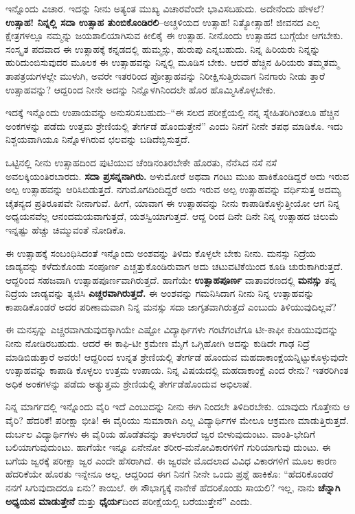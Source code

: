 ಇನ್ನೊಂದು ವಿಚಾರ. ಇದನ್ನು ನೀನು ಅತ್ಯಂತ ಮುಖ್ಯ ವಿಚಾರವೆಂದೇ ಭಾವಿಸಬಹುದು. ಅದೇನೆಂದು ಹೇಳಲೆ? \textbf{ಉತ್ಸಾಹ! ನಿನ್ನಲ್ಲಿ ಸದಾ ಉತ್ಸಾಹ ತುಂಬಿಕೊಂಡಿರಲಿ}–ಅಚ್ಚಳಿಯದ ಉತ್ಸಾಹ! ನಿತ್ಯೋತ್ಸಾಹ! ಜೀವನದ ಎಲ್ಲ ಕ್ಷೇತ್ರಗಳಲ್ಲೂ ನಮ್ಮನ್ನು ಜಯಶಾಲಿಯಾಗಿಸುವ ಕೀಲಿಕೈ ಈ ಉತ್ಸಾಹ. ನೀನೊಂದು ಉತ್ಸಾಹದ ಬುಗ್ಗೆಯೇ ಆಗಬೇಕು. ಸಂಸ್ಕೃತ ಪದವಾದ ಈ ಉತ್ಸಾಹಕ್ಕೆ ಕನ್ನಡದಲ್ಲಿ ಹುಮ್ಮಸ್ಸು, ಹುರುಪು ಎನ್ನಬಹುದು. ನಿನ್ನ ಹಿರಿಯರು ನಿನ್ನನ್ನು ಹುರಿದುಂಬಿಸುವುದರ ಮೂಲಕ ಈ ಉತ್ಸಾಹವನ್ನು ನಿನ್ನಲ್ಲಿ ಮೂಡಿಸ ಬೇಕು. ಆದರೆ ಹೆಚ್ಚಿನ ಹಿರಿಯರು ತಮ್ಮತಮ್ಮ ತಾಪತ್ರಯಗಳಲ್ಲೇ ಮುಳುಗಿ, ಅವರೇ ಇತರರಿಂದ ಪ್ರೋತ್ಸಾಹವನ್ನು ನಿರೀಕ್ಷಿಸುತ್ತಿರುವಾಗ ನಿನಗಾರು ನೀಡು ತ್ತಾರೆ ಉತ್ಸಾಹವನ್ನು? ಆದ್ದರಿಂದ ನೀನೇ ಅದನ್ನು ನಿನ್ನೊಳಗಿನಿಂದಲೇ ಹೊರ ಹೊಮ್ಮಿಸಿಕೊಳ್ಳಬೇಕು.

ಇದಕ್ಕೆ ಇನ್ನೊಂದು ಉಪಾಯವನ್ನು ಅನುಸರಿಸಬಹುದು–“ಈ ಸಲದ ಪರೀಕ್ಷೆಯಲ್ಲಿ ನನ್ನ ಸ್ನೇಹಿತರಿಗಿಂತಲೂ ಹೆಚ್ಚಿನ ಅಂಕಗಳನ್ನು ಪಡೆದು ಉತ್ತಮ ಶ್ರೇಣಿಯಲ್ಲಿ ತೇರ್ಗಡೆ ಹೊಂದುತ್ತೇನೆ” ಎಂದು ನಿನಗೆ ನೀನೇ ಶಪಥ ಮಾಡಿಕೊ. ಇದು ನಿಶ್ಚಯವಾಗಿಯೂ ನಿನ್ನೊಳಗಿರುವ ಛಲವನ್ನು ಬಡಿದೆಬ್ಬಿಸುತ್ತದೆ.

ಒಟ್ಟಿನಲ್ಲಿ ನೀನು ಉತ್ಸಾಹದಿಂದ ಪುಟಿಯುವ ಚೆಂಡಿನಂತಿರಬೇಕೇ ಹೊರತು, ನೆನೆಸಿದ ನಸೆ ನಸೆ ಅವಲಕ್ಕಿಯಂತಿರಬಾರದು. \textbf{ಸದಾ ಪ್ರಸನ್ನನಾಗಿರು.} ಅಳುಮೋರೆ ಅಥವಾ ಗಂಟು ಮುಖ ಹಾಕಿಕೊಂಡಿದ್ದರೆ ಅದು ಇರುವ ಅಲ್ಪ ಉತ್ಸಾಹವನ್ನು ಆರಿಸಿಬಿಡುತ್ತದೆ. ನಗುಮೊಗದಿಂದಿದ್ದರೆ ಅದು ಇರುವ ಅಲ್ಪ ಉತ್ಸಾಹವನ್ನು ವರ್ಧಿಸುತ್ತ ಅದಮ್ಯ ಚೈತನ್ಯದ ಪ್ರತಿರೂಪವೇ ನೀನಾಗುವೆ. ಹೀಗೆ, ಯಾವಾಗ ಈ ಉತ್ಸಾಹವನ್ನು ನೀನು ಕಾಪಾಡಿಕೊಳ್ಳುತ್ತೀಯೋ ಆಗ ನಿನ್ನ ಅಧ್ಯಯನವೆಲ್ಲ ಆನಂದಮಯವಾಗುತ್ತದೆ, ಯಶಸ್ವಿಯಾಗುತ್ತದೆ. ಆದ್ದ ರಿಂದ ದಿನೇ ದಿನೇ ನಿನ್ನ ಉತ್ಸಾಹದ ಚಿಲುಮೆ ಇನ್ನಷ್ಟು ಹೆಚ್ಚು ಚಿಮ್ಮುವಂತೆ ನೋಡಿಕೊ.

ಈ ಉತ್ಸಾಹಕ್ಕೆ ಸಂಬಂಧಿಸಿದಂತೆ ಇನ್ನೊಂದು ಅಂಶವನ್ನು ತಿಳಿದು ಕೊಳ್ಳಲೇ ಬೇಕು ನೀನು. ಮನಸ್ಸು ನಿದ್ರೆಯ ಜಾಡ್ಯವನ್ನು ಕಳೆದುಕೊಂಡು ಸಂಪೂರ್ಣ ಎಚ್ಚತ್ತುಕೊಂಡಿರುವಾಗ ಅದು ಚಟುವಟಿಕೆಯಿಂದ ಕೂಡಿ ಚುರುಕಾಗಿರುತ್ತದೆ. ಆದ್ದರಿಂದ ಸಹಜವಾಗಿ ಉತ್ಸಾಹಪೂರ್ಣವಾಗಿರುತ್ತದೆ. ಹಾಗೆಯೇ \textbf{ಉತ್ಸಾಹಪೂರ್ಣ} ವಾತಾವರಣದಲ್ಲಿ \textbf{ಮನಸ್ಸು} ತನ್ನ ನಿದ್ರೆಯ ಜಾಡ್ಯವನ್ನು ತ್ಯಜಿಸಿ \textbf{ಎಚ್ಚರವಾಗಿರುತ್ತದೆ.} ಈ ಅಂಶವನ್ನು ಗಮನಿಸಿದಾಗ ನೀನು ನಿನ್ನ ಉತ್ಸಾಹವನ್ನು ಕಾಪಾಡಿಕೊಂಡರೆ ಅದರ ಪರಿಣಾಮವಾಗಿ ನಿನ್ನ ಮನಸ್ಸು ಸದಾ ಜಾಗೃತವಾಗಿರುತ್ತದೆ ಎಂಬುದು ತಿಳಿಯುವುದಿಲ್ಲವೆ?

ಈ ಮನಸ್ಸನ್ನು ಎಚ್ಚರವಾಗಿಡುವುದಕ್ಕಾಗಿಯೇ ಎಷ್ಟೋ ವಿದ್ಯಾರ್ಥಿಗಳು ಗಂಟೆಗಂಟೆಗೂ ಟೀ-ಕಾಫೀ ಕುಡಿಯುವುದನ್ನು ನೀನು ನೋಡಿರಬಹುದು. ಆದರೆ ಈ ಕಾಫಿ-ಟೀ ಕ್ರಮೇಣ ಮೈಗೆ ಒಗ್ಗಿಹೋಗಿ ಅದನ್ನು ಕುಡಿದೇ ಗಾಢ ನಿದ್ರೆ ಮಾಡಿಬಿಡುತ್ತಾರೆ ಅವರು! ಆದ್ದರಿಂದ ಉನ್ನತ ಶ್ರೇಣಿಯಲ್ಲಿ ತೇರ್ಗಡೆ ಹೊಂದುವ ಮಹದಾಕಾಂಕ್ಷೆಯನ್ನಿಟ್ಟುಕೊಳ್ಳುವುದೇ ಉತ್ಸಾಹವನ್ನು ಕಾಪಾಡಿ ಕೊಳ್ಳಲು ಉತ್ತಮ ಉಪಾಯ. ನಿನ್ನ ವಿಷಯದಲ್ಲಿ ಮಹದಾಕಾಂಕ್ಷೆ ಎಂದ ರೇನು? ಇತರರಿಗಿಂತ ಅಧಿಕ ಅಂಕಗಳನ್ನು ಪಡೆದು ಅತ್ಯುತ್ತಮ ಶ್ರೇಣಿಯಲ್ಲಿ ತೇರ್ಗಡೆಹೊಂದುವ ಅಭಿಲಾಷೆ.

ನಿನ್ನ ಮಾರ್ಗದಲ್ಲಿ ಇನ್ನೊಂದು ವೈರಿ ಇದೆ ಎಂಬುದನ್ನು ನೀನು ಈಗಿ ನಿಂದಲೇ ತಿಳಿದಿರಬೇಕು. ಯಾವುದು ಗೊತ್ತೇನು ಆ ವೈರಿ? ಹೆದರಿಕೆ! ಪರೀಕ್ಷಾ ಭೀತಿ! ಈ ವೈರಿಯು ಸುಮಾರಾಗಿ ಎಲ್ಲ ವಿದ್ಯಾರ್ಥಿಗಳ ಮೇಲೂ ಆಕ್ರಮಣ ಮಾಡುತ್ತಿರುತ್ತದೆ. ದುರ್ಬಲ ವಿದ್ಯಾರ್ಥಿಗಳು ಈ ವೈರಿಯ ಹೊಡೆತವನ್ನು ತಾಳಲಾರದೆ ಜ್ವರ ಬೀಳುವುದುಂಟು. ವಾಂತಿ-ಭೇದಿಗೆ ಬಲಿಯಾಗುವುದುಂಟು. ಹಾಗೆಯೇ ಇನ್ನೂ ಏನೇನೋ ಶರೀರ-ಮನೋವಿಕಾರಗಳಿಗೆ ಗುರಿಯಾಗುವು ದುಂಟು. ಈ ಬಗೆಯ ಜ್ವರಕ್ಕೆ ಪರೀಕ್ಷಾ ಜ್ವರ ಎಂದೇ ಹೆಸರಾಗಿದೆ. ಈ ಜ್ವರವೇ ಮೊದಲಾದ ವಿವಿಧ ವಿಕಾರಗಳಿಗೆ ಮೂಲ ಕಾರಣ ಹೆದರಿಕೆಯೇ ಹೊರತು ಇನ್ನೇನೂ ಅಲ್ಲ. ಆದ್ದರಿಂದ ಈಗ ನಿನಗೆ ನೀನೇ ಒಂದು ಪ್ರಶ್ನೆ ಹಾಕಿಕೊ: “ಹೆದರಿಕೊಂಡರೆ ನನಗೆ ಸಿಗುವುದಾದರೂ ಏನು? ಕಾಯಿಲೆ. ಈ ಸೌಭಾಗ್ಯಕ್ಕೆ ನಾನೇಕೆ ಹೆದರಿಕೊಂಡು ಸಾಯಲಿ? ಇಲ್ಲ, ನಾನು \textbf{ಚೆನ್ನಾಗಿ ಅಧ್ಯಯನ ಮಾಡುತ್ತೇನೆ} ಮತ್ತು \textbf{ಧೈರ್ಯ}ದಿಂದ ಪರೀಕ್ಷೆಯಲ್ಲಿ ಬರೆಯುತ್ತೇನೆ” ಎಂದು.

